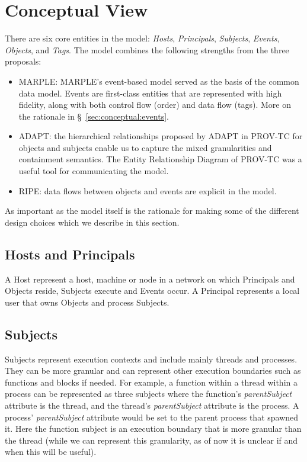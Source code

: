 \documentclass[10pt, conference, onecolumn]{IEEEtran}
\begin{document}
\section{Conceptual View}\label{sec:conceptual}

There are six core entities in the model: \textit{Hosts},
\textit{Principals}, \textit{Subjects}, \textit{Events},
\textit{Objects}, and \textit{Tags}.  The model combines the following
strengths from the three proposals:

\begin{itemize}

  \item MARPLE: MARPLE's event-based model served as the basis of the
    common data model. Events are first-class entities that are
    represented with high fidelity, along with both control flow
    (order) and data flow (tags). More on the rationale in
    \S~\ref{sec:conceptual:events}.

   \item ADAPT: the hierarchical relationships proposed by ADAPT in
     PROV-TC for objects and subjects enable us to capture the mixed
     granularities and containment semantics. The Entity Relationship
     Diagram of PROV-TC was a useful tool for communicating the model.

   \item RIPE: data flows between objects and events are explicit in
     the model.
     
\end{itemize}

As important as the model itself is the rationale for making some of
the different design choices which we describe in this section.  

\subsection{Hosts and Principals}

A Host represent a host, machine or node in a network on which
Principals and Objects reside, Subjects execute and Events occur. A
Principal represents a local user that owns Objects and process
Subjects.

\subsection{Subjects}

Subjects represent execution contexts and include mainly threads and
processes. They can be more granular and can represent other execution
boundaries such as functions and blocks if needed. For example, a
function within a thread within a process can be represented as three
subjects where the function's \textit{parentSubject} attribute is the
thread, and the thread's \textit{parentSubject} attribute is the
process. A process' \textit{parentSubject} attribute would be set to
the parent process that spawned it. Here the function subject is an
execution boundary that is more granular than the thread (while we can
represent this granularity, as of now it is unclear if and when this
will be useful).
\end{document}
